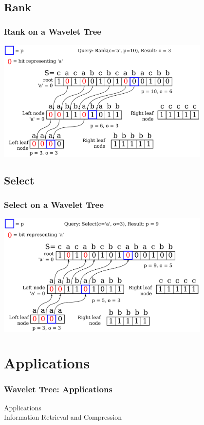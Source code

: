 \documentclass{beamer}
\begin{document}
\subsection{Rank}
\begin{frame}
\frametitle{Rank on a Wavelet Tree}
\begin{center}
	\center \includegraphics[width=0.8\textwidth]{RankDrawing}
\end{center}
\end{frame}


\subsection{Select}
\begin{frame}
\frametitle{Select on a Wavelet Tree}
\begin{center}
	\includegraphics[width=0.8\textwidth]{SelectDrawing}
\end{center}
\end{frame}

\section{Applications}
\begin{frame}
\frametitle{Wavelet Tree: Applications}
\begin{center} 
\Huge{Applications\\} 
\Large{Information Retrieval and Compression}

\end{center}
\end{frame}
\end{document}
